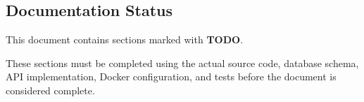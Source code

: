 \documentclass[12pt,a4paper]{article}
\begin{document}
\subsection{Documentation Status}

This document contains sections marked with \textbf{TODO}.

These sections must be completed using the actual source code,
database schema, API implementation, Docker configuration, and
tests before the document is considered complete.

\end{document}
